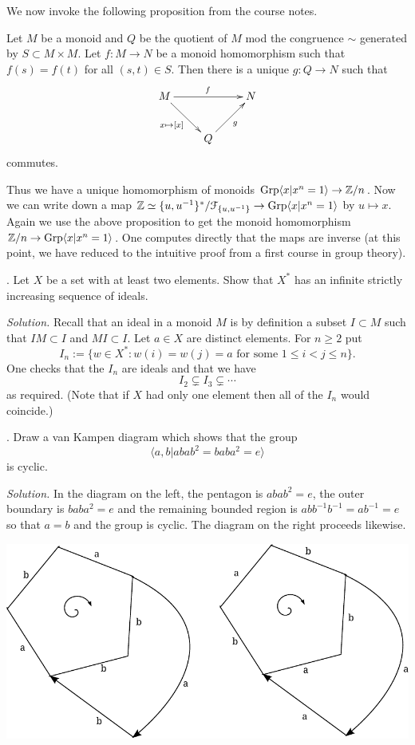 \documentclass[10pt,a4paper,reqno]{amsart}
\begin{document}
We now invoke the following proposition from the course notes.

\begin{prop} Let $M$ be a monoid and $Q$ be the quotient of $M$ mod the
    congruence $\sim$ generated by $S \subset M\times M$. Let $f: M \rightarrow
    N$ be a monoid homomorphism such that $f(s) = f(t)$ for all $(s,t)\in S$.
    Then there is a unique $g: Q \rightarrow N$ such that \[\xymatrix{ M
    \ar[rr]^f \ar[dr]_{x\mapsto [x]}& & N\\ & Q\ar[ur]_g } \] commutes.
\end{prop}

Thus we have a unique homomorphism of monoids $\mathrm{Grp}\langle x|x^n=1\rangle \rightarrow
\mathbb{Z}/n$. Now we can write down a map $\mathbb{Z} \simeq
\{u,u^{-1}\}^*/\mathcal{F}_{\{u,u^{-1}\}} \rightarrow \mathrm{Grp}\langle x|x^n=1\rangle$ by $u
\mapsto x$. Again we use the above proposition to get the monoid homomorphism
$\mathbb{Z}/n \rightarrow \mathrm{Grp}\langle x|x^n=1\rangle$. One computes directly that the maps
are inverse (at this point, we have reduced to the intuitive proof from a first
course in group theory).

\bigskip

. Let $X$ be a set with at least two elements. Show that $X^*$ has
an infinite strictly increasing sequence of ideals.

\bigskip

\emph{Solution.} Recall that an ideal in a monoid $M$ is by definition a subset
$I \subset M$ such that $IM \subset I$ and $MI \subset I$. Let $a\in X$ are
distinct elements. For $n \ge 2$ put \[ I_n := \{w \in X^* : w(i) = w(j) = a
\text{ for some } 1 \le i < j \le n\}.\] One checks that the $I_n$ are ideals
and that we have \[I_2 \subsetneq I_3 \subsetneq \cdots\] as required. (Note
that if $X$ had only one element then all of the $I_n$ would coincide.)

\bigskip

. Draw a van Kampen diagram which shows that the group \[\langle a,b
| abab^2 = baba^2 = e\rangle\] is cyclic.

\bigskip

\emph{Solution.} In the diagram on the left, the pentagon is $abab^2=e$, the
outer boundary is $baba^2=e$ and the remaining bounded region is
$abb^{-1}b^{-1} = ab^{-1} = e$ so that $a=b$ and the group is cyclic. The
diagram on the right proceeds likewise.

    \begin{center}
        \includegraphics[scale=0.8]{resources/van-kampen-final.pdf}
    \end{center}
\end{document}
